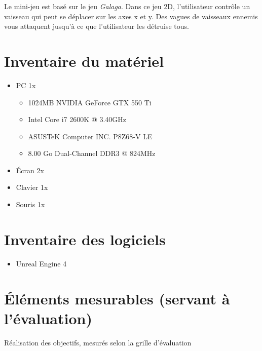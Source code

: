 \documentclass[11pt, a4paper]{article}
\begin{document}
Le mini-jeu est basé sur le jeu \textit{Galaga}. Dans ce jeu 2D, l'utilisateur contrôle un vaisseau qui peut se déplacer sur les axes x et y. Des vagues de vaisseaux ennemis vous attaquent jusqu'à ce que l'utilisateur les détruise tous.
\section{Inventaire du matériel}
\begin{itemize}
\item PC 1x
	\begin{itemize}
	\item 1024MB NVIDIA GeForce GTX 550 Ti
	\item Intel Core i7 2600K @ 3.40GHz
	\item ASUSTeK Computer INC. P8Z68-V LE
	\item 8.00 Go Dual-Channel DDR3 @ 824MHz
	\end{itemize}
\item Écran 2x
\item Clavier 1x
\item Souris 1x
\end{itemize}
\section{Inventaire des logiciels}
\begin{itemize}
\item Unreal Engine 4
\end{itemize}
\section{Éléments mesurables (servant à l'évaluation)}
Réalisation des objectifs, mesurés selon la grille d'évaluation
\end{document}
